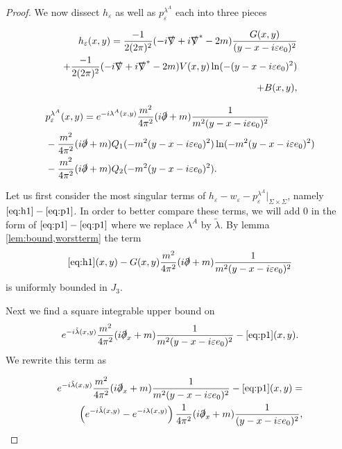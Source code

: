 \documentclass[b5paper,draft,openbib,12pt]{memoir}
\begin{document}
\begin{proof}
We now dissect \(h_\varepsilon\) as well as \(p_\varepsilon^{\lambda^A}\) each into three pieces

\begin{align}\label{eq:h1}
h_\varepsilon(x,y)= \frac{-1}{2(2\pi)^2} (-i\slashed{\nabla} + i \slashed{\nabla}^*-2m) \frac{G(x,y)}{(y-x-i\varepsilon e_0)^2}\\\label{eq:h2}
+ \frac{-1}{2(2\pi)^2} (-i\slashed{\nabla} + i \slashed{\nabla}^*-2m)  V(x,y) \ln (-(y-x-i\varepsilon e_0)^2)\\\label{eq:h3}
+ B(x,y),
\end{align}


\begin{align}\label{eq:p1}
&p_\varepsilon^{\lambda^A}(x,y)=e^{-i\lambda^A(x,y)}\frac{m^2}{4\pi^2}(i\slashed{\partial}+m) \frac{1}{m^2(y-x-i\varepsilon e_0)^2}\\\label{eq:p2}
&-\frac{m^2}{4\pi^2}(i\slashed{\partial}+m) Q_1(-m^2(y-x-i\varepsilon e_0)^2) \ln (-m^2(y-x-i\varepsilon e_0)^2)\\\label{eq:p3}
&-\frac{m^2}{4\pi^2}(i\slashed{\partial}+m) Q_2(-m^2(y-x-i\varepsilon e_0)^2).
\end{align}

Let us first consider the most singular terms of  
\(h_\varepsilon-w_\varepsilon-
p^{\lambda^A}_{\varepsilon}|_{\Sigma\times \Sigma}\), 
namely \(\eqref{eq:h1}-\eqref{eq:p1}\). In order to 
better compare these terms, we will add \(0\) in the 
form of \(\eqref{eq:p1}-\eqref{eq:p1}\) 
where we
replace \(\lambda^A\) by \(\tilde{\lambda}\).
By lemma \ref{lem:bound,worstterm} the term 
\begin{equation}
\eqref{eq:h1}(x,y)- G(x,y)\frac{m^2}{4\pi^2}(i\slashed{\partial}+m) \frac{1}{m^2(y-x-i\varepsilon e_0)^2}
\end{equation}
is uniformly bounded in \(J_3\).

Next we find a square integrable upper bound on 
\begin{equation}
e^{-i\tilde{\lambda}(x,y)} \frac{m^2}{4\pi^2} (i\slashed{\partial}_x+m)\frac{1}{m^2(y-x-i\varepsilon e_0)^2}-\eqref{eq:p1}(x,y).
\end{equation}
We rewrite this term as

\begin{align}
e^{-i\tilde{\lambda}(x,y)} \frac{m^2}{4\pi^2} (i\slashed{\partial}_x+m)\frac{1}{m^2(y-x-i\varepsilon e_0)^2}-\eqref{eq:p1}(x,y)=\\\label{eq:ivp2estimate}
\left(e^{-i\tilde{\lambda}(x,y)}-e^{-i\lambda(x,y)}\right) \frac{1}{4\pi^2}(i\slashed{\partial}_x+m)\frac{1}{(y-x-i\varepsilon e_0)^2},
\end{align}


\end{proof}
\end{document}
